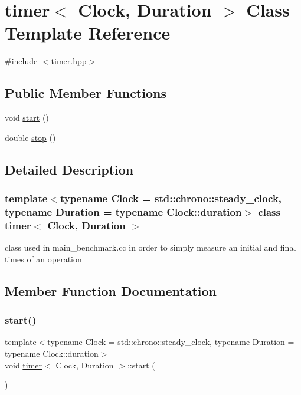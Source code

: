 \hypertarget{classtimer}{}\section{timer$<$ Clock, Duration $>$ Class Template Reference}
\label{classtimer}


{\ttfamily \#include $<$timer.\+hpp$>$}

\subsection*{Public Member Functions}
\begin{DoxyCompactItemize}
\item 
void \hyperlink{classtimer_a52e8bc315f5d16d70361b4917d6b6b90}{start} ()
\item 
double \hyperlink{classtimer_aba4d20a93d34f73f3b6d728aa4054235}{stop} ()
\end{DoxyCompactItemize}


\subsection{Detailed Description}
\subsubsection*{template$<$typename Clock = std\+::chrono\+::steady\+\_\+clock, typename Duration = typename Clock\+::duration$>$\newline
class timer$<$ Clock, Duration $>$}

class used in main\+\_\+benchmark.\+cc in order to simply measure an initial and final times of an operation 

\subsection{Member Function Documentation}
\mbox{\label{classtimer_a52e8bc315f5d16d70361b4917d6b6b90}} 
\subsubsection{\texorpdfstring{start()}{start()}}
{\footnotesize\ttfamily template$<$typename Clock  = std\+::chrono\+::steady\+\_\+clock, typename Duration  = typename Clock\+::duration$>$ \\
void \hyperlink{classtimer}{timer}$<$ Clock, Duration $>$\+::start (\begin{DoxyParamCaption}{ }\end{DoxyParamCaption})\hspace{0.3cm}{\ttfamily [inline]}}

